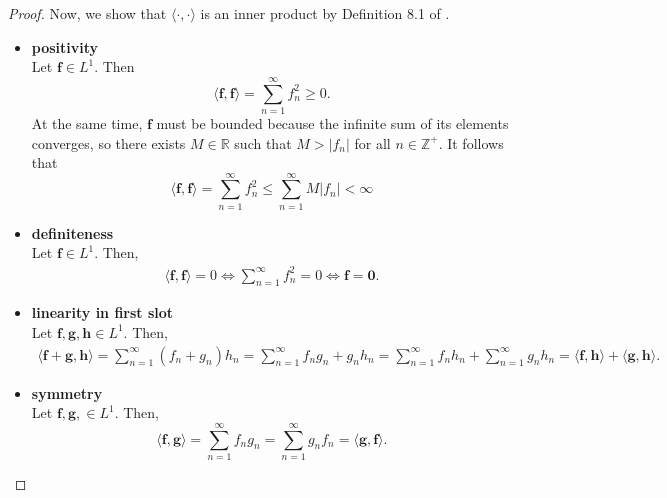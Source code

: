\begin{proof}
    Now, we show that $\langle \cdot , \cdot \rangle$ is an inner product by Definition 8.1 of \cite{axler2020}.
    \begin{itemize}
        \item \textbf{positivity}\\
            Let $\mathbf{f} \in L^1$.
            Then
            \begin{equation*}
                \langle \mathbf{f}, \mathbf{f} \rangle
                = \sum\limits_{n=1}^{\infty} f_n^2
                \geq 0.
            \end{equation*}
            At the same time, $\mathbf{f}$ must be bounded because the infinite sum of its elements converges, so there exists $M \in \mathbb{R}$ such that $M > \lvert f_n \rvert$ for all $n \in \mathbb{Z}^{+}$.
            It follows that
            \begin{equation*}
                \langle \mathbf{f}, \mathbf{f} \rangle
                = \sum\limits_{n=1}^{\infty} f_n^2
                \leq \sum\limits_{n=1}^{\infty}
                M \lvert f_n \rvert < \infty
            \end{equation*}

        \item \textbf{definiteness} \\ Let $\mathbf{f} \in L^1$.
            Then,
            \begin{align*}
                \langle \mathbf{f}, \mathbf{f} \rangle = 0
                \iff
                \sum\limits_{n=1}^{\infty} f_n^2 = 0
                \iff
                \mathbf{f} = \mathbf{0}.
            \end{align*}

        \item \textbf{linearity in first slot} \\
            Let $\mathbf{f}, \mathbf{g}, \mathbf{h} \in L^1$.
            Then,
            \begin{align*}
                \langle \mathbf{f} + \mathbf{g}, \mathbf{h} \rangle
                = \sum\limits_{n=1}^{\infty} (f_n + g_n)h_n
                = \sum\limits_{n=1}^{\infty} f_ng_n + g_nh_n
                = \sum\limits_{n=1}^{\infty} f_nh_n +\sum\limits_{n=1}^{\infty} g_nh_n
                = \langle \mathbf{f}, \mathbf{h} \rangle + \langle \mathbf{g}, \mathbf{h} \rangle.
            \end{align*}

        \item \textbf{symmetry} \\
            Let $\mathbf{f}, \mathbf{g}, \in L^1$.
            Then,
            \begin{equation*}
                \langle \mathbf{f}, \mathbf{g} \rangle
                = \sum\limits_{n=1}^{\infty} f_ng_n
                = \sum\limits_{n=1}^{\infty} g_nf_n
                = \langle \mathbf{g}, \mathbf{f} \rangle.
            \end{equation*}
    \end{itemize}
\end{proof}

